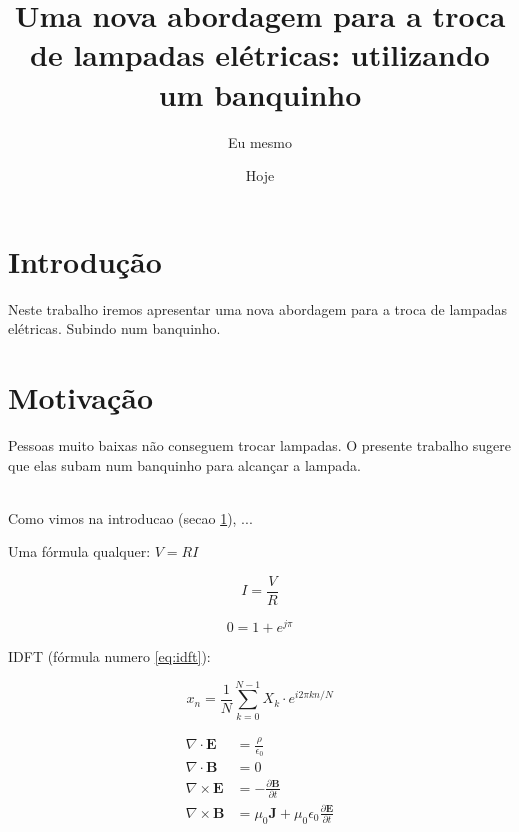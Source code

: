 \documentclass{article}
\author{Eu mesmo}
\date{Hoje}
\title{Uma nova abordagem para a troca de
       lampadas elétricas: utilizando um banquinho}
\newcommand{\vetor}[1]{\textbf{#1}}
\begin{document}
\maketitle

\newpage

\section{Introdução}
\label{sec:intro}

Neste trabalho  iremos apresentar uma nova abordagem
para a troca  de lampadas elétricas.
Subindo  num  banquinho. %


\section{Motivação}
\label{sec:motiv}

Pessoas muito baixas não conseguem trocar lampadas.
O presente trabalho sugere que elas subam num
banquinho para alcançar a lampada.

\hfill \\

Como vimos na introducao (secao \ref{sec:intro}),
...

Uma fórmula qualquer: $V=R I$

$$I = \frac{V}{R}$$

$$0=1+e^{j\pi}$$

IDFT (fórmula numero \ref{eq:idft}):

\begin{equation}
\label{eq:idft}
x_n = \frac{1}{N}
\sum_{k=0}^{N-1} X_k \cdot
e^{i2\pi kn/N}
\end{equation}

\begin{align}
\nabla \cdot \vetor{E} & = \frac{\rho}{\epsilon_0} \\
\nabla \cdot \vetor{B} & = 0 \\
\nabla \times \vetor{E}
& = - \frac{\partial \vetor{B}}{\partial t} \\
\nabla \times \vetor{B} & =
\mu_0\vetor{J} + \mu_0 \epsilon_0
\frac{\partial \vetor{E}}{\partial t}
\end{align}
\end{document}
